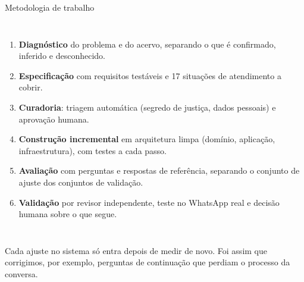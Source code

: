 \documentclass[aspectratio=169,10pt]{beamer}
\begin{document}
\begin{frame}{Metodologia de trabalho}
  \begin{columns}[c]
    \centering
    \scriptsize
    \begin{enumerate}\setlength\itemsep{2pt}
      \item[\textbf{1}] \textbf{Diagnóstico} do problema e do acervo, separando o que é confirmado, inferido e desconhecido.
      \item[\textbf{2}] \textbf{Especificação} com requisitos testáveis e 17 situações de atendimento a cobrir.
      \item[\textbf{3}] \textbf{Curadoria}: triagem automática (segredo de justiça, dados pessoais) e aprovação humana.
      \item[\textbf{4}] \textbf{Construção incremental} em arquitetura limpa (domínio, aplicação, infraestrutura), com testes a cada passo.
      \item[\textbf{5}] \textbf{Avaliação} com perguntas e respostas de referência, separando o conjunto de ajuste dos conjuntos de validação.
      \item[\textbf{6}] \textbf{Validação} por revisor independente, teste no WhatsApp real e decisão humana sobre o que segue.
    \end{enumerate}
  \end{columns}
  \vfill
  {\small Cada ajuste no sistema só entra depois de medir de novo. Foi assim que corrigimos, por exemplo, perguntas de continuação que perdiam o processo da conversa.}
\end{frame}
\end{document}
